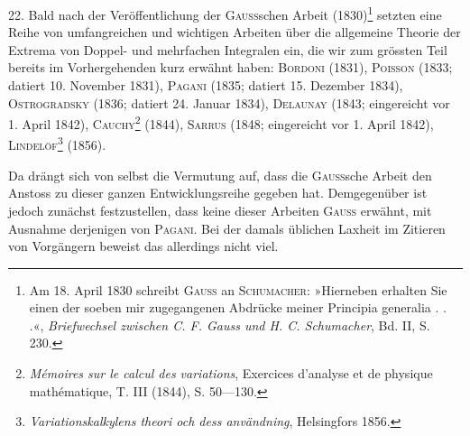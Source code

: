 \clearpage\begingroup\NoSourceHead{}
\renewcommand{\thefootnote}{\arabic{footnote})}\setcounter{footnote}{58}
\begin{center}\end{center}
\noindent\hspace*{\parindent}22. Bald nach der Veröffentlichung der \textsc{Gauss}schen Arbeit (1830)\footnote{Am 18. April 1830 schreibt \textsc{Gauss} an \textsc{Schumacher}: »Hierneben erhalten Sie einen der soeben
mir zugegangenen Abdrücke meiner Principia generalia . . .«, \textit{Briefwechsel zwischen C. F. Gauss und H. C.
Schumacher}, Bd. II, S. 230.}
setzten eine Reihe von umfangreichen und wichtigen Arbeiten über die allgemeine
Theorie der Extrema von Doppel- und mehrfachen Integralen ein,
die wir zum grössten Teil bereits im Vorhergehenden kurz erwähnt haben:
\textsc{Bordoni} (1831), \textsc{Poisson} (1833; datiert 10. November 1831), \textsc{Pagani} (1835;
datiert 15. Dezember 1834), \textsc{Ostrogradsky} (1836; datiert 24. Januar 1834),
\textsc{Delaunay} (1843; eingereicht vor 1. April 1842), \textsc{Cauchy}\footnote{\textit{Mémoires sur le calcul des variations}, Exercices d’analyse et de physique mathématique, T. III
(1844), S. 50—130.} (1844), \textsc{Sarrus}
(1848; eingereicht vor 1. April 1842), \textsc{Lindelöf}\footnote{\textit{Variationskalkylens theori och dess användning}, Helsingfors 1856.} (1856).

Da drängt sich von selbst die Vermutung auf, dass die \textsc{Gauss}sche Arbeit
den Anstoss zu dieser ganzen Entwicklungsreihe gegeben hat. Demgegenüber
ist jedoch zunächst festzustellen, dass keine dieser Arbeiten \textsc{Gauss} erwähnt,
mit Ausnahme derjenigen von \textsc{Pagani}. Bei der damals üblichen Laxheit im
Zitieren von Vorgängern beweist das allerdings nicht viel.

